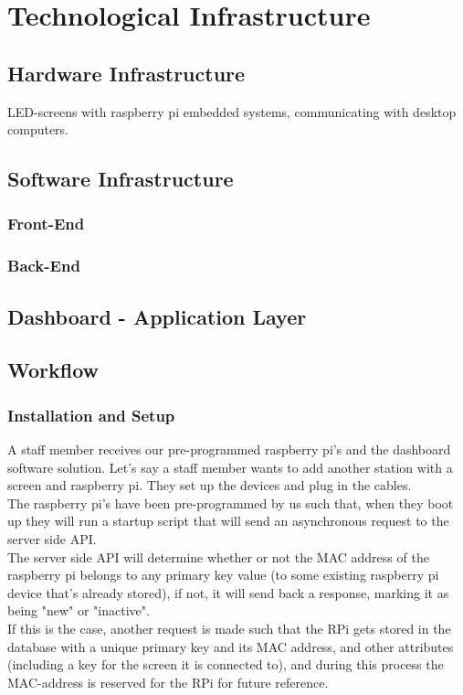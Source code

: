 \documentclass{exam}
\begin{document}
\section{Technological Infrastructure}
\bigskip
\subsection{Hardware Infrastructure}
\bigskip
LED-screens with raspberry pi embedded systems, communicating with desktop computers.\\
\bigskip

\subsection{Software Infrastructure}
\bigskip
\subsubsection{Front-End}
\bigskip
\subsubsection{Back-End}
\bigskip

\subsection{Dashboard - Application Layer}
\bigskip

\subsection{Workflow}
\bigskip
\subsubsection{Installation and Setup}
\bigskip
A staff member receives our pre-programmed raspberry pi's and the dashboard software solution. Let's say a staff member wants to add another station with a screen and raspberry pi. They set up the devices and plug in the cables.\\ 
\bigskip
The raspberry pi's have been pre-programmed by us such that, when they boot up they will run a startup script that will send an asynchronous request to the server side API.\\
\bigskip
The server side API will determine whether or not the MAC address of the raspberry pi belongs to any primary key value (to some existing raspberry pi device that's already stored), if not, it will send back a response, marking it as being "new" or "inactive".\\
\bigskip
If this is the case, another request is made such that the RPi gets stored in the database with a unique primary key and its MAC address, and other attributes (including a key for the screen it is connected to), and during this process the MAC-address is reserved for the RPi for future reference.
\end{document}
